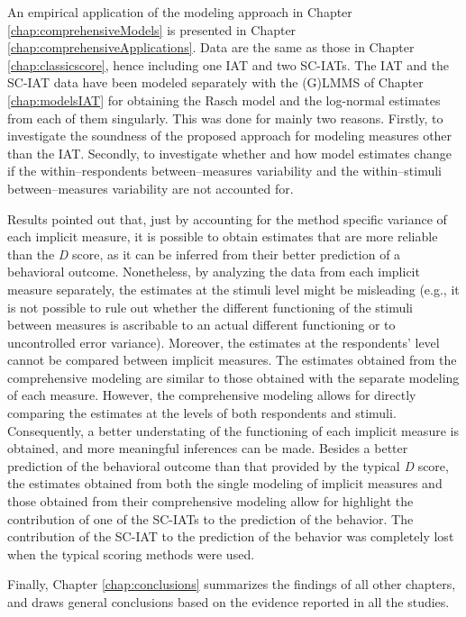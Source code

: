 \documentclass[12pt]{book}
\begin{document}
An empirical application of the modeling approach in Chapter \ref{chap:comprehensiveModels} is presented in Chapter \ref{chap:comprehensiveApplications}. Data are the same as those in Chapter \ref{chap:classicscore}, hence including one IAT and two SC-IATs. 
The IAT and the SC-IAT data have been modeled separately with the (G)LMMS of Chapter \ref{chap:modelsIAT} for obtaining the Rasch model and the log-normal estimates from each of them singularly. 
This was done for mainly two reasons. Firstly, to investigate the soundness of the proposed approach for modeling measures other than the IAT. Secondly, to investigate whether and how model estimates change if the within--respondents between--measures variability and the within--stimuli between--measures variability are not accounted for. 

Results pointed out that, just by accounting for the method specific variance of each implicit measure, it is possible to obtain estimates that are more reliable than the \emph{D} score, as it can be inferred from their better prediction of a behavioral outcome. 
Nonetheless, by analyzing the data from each implicit measure separately, the estimates at the stimuli level might be misleading (e.g., it is not possible to rule out whether the different functioning of the stimuli between measures is ascribable to an actual different functioning or to uncontrolled error variance). 
Moreover, the estimates at the respondents' level cannot be compared between implicit measures.
The estimates obtained from the comprehensive modeling are similar to those obtained with the separate modeling of each measure. However, the comprehensive modeling allows for directly comparing the estimates at the levels of both respondents and stimuli. Consequently, a better understating of the functioning of each implicit measure is obtained, and more meaningful inferences can be made.  
Besides a better prediction of the behavioral outcome than that provided by the typical \emph{D} score, the estimates obtained from both the single modeling of implicit measures and those obtained from their comprehensive modeling allow for highlight the contribution of one of the SC-IATs to the prediction of the behavior. The contribution of the SC-IAT to the prediction of the behavior was completely lost when the typical scoring methods were used. 


Finally, Chapter \ref{chap:conclusions} summarizes the findings of all other chapters, and draws general conclusions based on the evidence reported in all the studies.
% 
%
\end{document}
